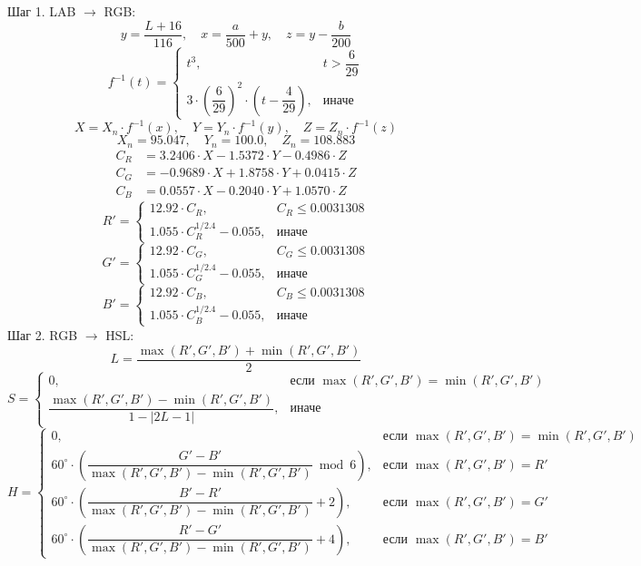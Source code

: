 \documentclass[12pt,a4paper]{article}
\begin{document}
Шаг 1. LAB \(\to\) RGB:
\[
y = \frac{L + 16}{116},\quad x = \frac{a}{500} + y,\quad z = y - \frac{b}{200}
\]
\[
f^{-1}(t) = \begin{cases} t^3, & t > \dfrac{6}{29} \\[8pt] 3 \cdot \left( \dfrac{6}{29} \right)^2 \cdot \left( t - \dfrac{4}{29} \right), & \text{иначе} \end{cases}
\]
\[
X = X_n \cdot f^{-1}(x),\quad Y = Y_n \cdot f^{-1}(y),\quad Z = Z_n \cdot f^{-1}(z)
\]
\[
X_n = 95.047,\quad Y_n = 100.0,\quad Z_n = 108.883
\]
\begin{align*}
C_R &= 3.2406 \cdot X - 1.5372 \cdot Y - 0.4986 \cdot Z \\
C_G &= -0.9689 \cdot X + 1.8758 \cdot Y + 0.0415 \cdot Z \\
C_B &= 0.0557 \cdot X - 0.2040 \cdot Y + 1.0570 \cdot Z
\end{align*}
\[
R' = \begin{cases} 12.92 \cdot C_R, & C_R \le 0.0031308 \\[8pt] 1.055 \cdot C_R^{1/2.4} - 0.055, & \text{иначе} \end{cases}
\]
\[
G' = \begin{cases} 12.92 \cdot C_G, & C_G \le 0.0031308 \\[8pt] 1.055 \cdot C_G^{1/2.4} - 0.055, & \text{иначе} \end{cases}
\]
\[
B' = \begin{cases} 12.92 \cdot C_B, & C_B \le 0.0031308 \\[8pt] 1.055 \cdot C_B^{1/2.4} - 0.055, & \text{иначе} \end{cases}
\]
Шаг 2. RGB \(\to\) HSL:
\[
L = \frac{\max(R', G', B') + \min(R', G', B')}{2}
\]
\[
S = \begin{cases}
0, & \text{если } \max(R', G', B') = \min(R', G', B') \\[8pt]
\dfrac{\max(R', G', B') - \min(R', G', B')}{1 - |2L - 1|}, & \text{иначе}
\end{cases}
\]
\[
H = \begin{cases}
0, & \text{если } \max(R', G', B') = \min(R', G', B') \\[8pt]
60^\circ \cdot \left( \dfrac{G' - B'}{\max(R', G', B') - \min(R', G', B')} \bmod 6 \right), & \text{если } \max(R', G', B') = R' \\[12pt]
60^\circ \cdot \left( \dfrac{B' - R'}{\max(R', G', B') - \min(R', G', B')} + 2 \right), & \text{если } \max(R', G', B') = G' \\[12pt]
60^\circ \cdot \left( \dfrac{R' - G'}{\max(R', G', B') - \min(R', G', B')} + 4 \right), & \text{если } \max(R', G', B') = B'
\end{cases}
\]
\end{document}
